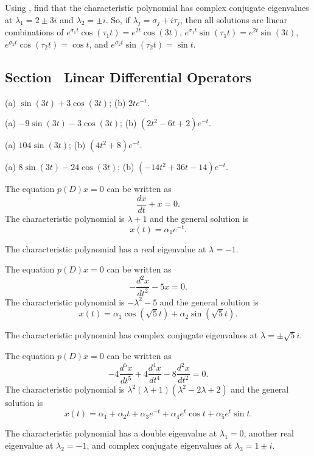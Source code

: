 \documentclass{ximera}
\begin{document}
\soln Using \Matlab, find that the characteristic polynomial has complex
conjugate eigenvalues at $\lambda_1 = 2 \pm 3i$ and $\lambda_2 = \pm i$.
So, if $\lambda_j = \sigma_j + i\tau_j$, then all solutions are linear
combinations of $e^{\sigma_1 t}\cos(\tau_1 t) = e^{2t}\cos(3t)$,
$e^{\sigma_1 t}\sin(\tau_1 t) = e^{2t}\sin(3t)$,
$e^{\sigma_2 t}\cos(\tau_2 t) = \cos t$, and
$e^{\sigma_2 t}\sin(\tau_2 t) = \sin t$.



\newpage
\subsection*{Section~\protect{\ref{S:LDO}} Linear Differential Operators}

 \ans (a) $\sin(3t)+3\cos(3t)$; (b) $2te^{-t}$.

 \ans (a) $-9\sin(3t)-3\cos(3t)$; (b) $(2t^2-6t+2)e^{-t}$.

 \ans (a) $104\sin(3t)$; (b) $(4t^2+8)e^{-t}$.

 \ans (a) $8\sin(3t)-24\cos(3t)$; (b) $(-14t^2+36t-14)e^{-t}$.


 \ans The equation $p(D)x = 0$ can be written as
\[
\frac{dx}{dt} + x = 0.
\]
The characteristic polynomial is
$\lambda + 1$
and the general solution is
\[
x(t) = \alpha_1e^{-t}.
\]

\soln The characteristic polynomial has a real eigenvalue at $\lambda = -1$.

 \ans The equation $p(D)x = 0$ can be written as
\[
-\frac{d^2x}{dt^2} - 5x = 0.
\]
The characteristic polynomial is
$-\lambda^2 - 5$
and the general solution is
\[
x(t) = \alpha_1\cos(\sqrt{5}t) + \alpha_2\sin(\sqrt{5}t).
\]

\soln The characteristic polynomial has complex conjugate eigenvalues
at $\lambda = \pm\sqrt{5}i$.


 \ans The equation $p(D)x = 0$ can be written as
\[
-4\frac{d^5x}{dt^5} + 4\frac{d^4x}{dt^4} - 8\frac{d^2x}{dt^2} = 0.
\]
The characteristic polynomial is
$\lambda^2(\lambda + 1)(\lambda^2 - 2\lambda + 2)$
and the general solution is
\[
x(t) = \alpha_1 + \alpha_2 t + \alpha_3e^{-t} +
\alpha_4e^t\cos t + \alpha_5e^t\sin t.
\]

\soln The characteristic polynomial has a double eigenvalue at
$\lambda_1 = 0$, another real eigenvalue at $\lambda_2 = -1$, and complex
conjugate eigenvalues at $\lambda_3 = 1 \pm i$.
\end{document}
